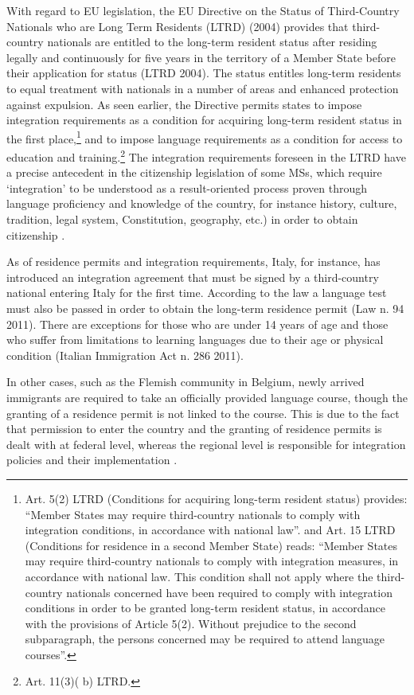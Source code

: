 \documentclass[output=paper,colorlinks,citecolor=brown]{langscibook}
\begin{document}
With regard to EU legislation, the EU Directive on the Status of Third-Country Nationals who are Long Term Residents (LTRD) (2004) provides that third-country nationals are entitled to the long-term resident status after residing legally and continuously for five years in the territory of a Member State before their application for status (LTRD 2004). The status entitles long-term residents to equal treatment with nationals in a number of areas and enhanced protection against expulsion. As seen earlier, the Directive permits states to impose integration requirements as a condition for acquiring long-term resident status in the first place,\footnote{Art. 5(2) LTRD (Conditions for acquiring long-term resident status) provides: ``Member States may require third-country nationals to comply with integration conditions, in accordance with national law''. and Art. 15 LTRD (Conditions for residence in a second Member State) reads: ``Member States may require third-country nationals to comply with integration measures, in accordance with national law. This condition shall not apply where the third-country nationals concerned have been required to comply with integration conditions in order to be granted long-term resident status, in accordance with the provisions of Article 5(2). Without prejudice to the second subparagraph, the persons concerned may be required to attend language courses''.} and to impose language requirements as a condition for access to education and training.\footnote{Art. 11(3)( b) LTRD. } The integration requirements foreseen in the LTRD have a precise antecedent in the citizenship legislation of some MSs, which require `integration' to be understood as a result-oriented process proven through language proficiency and knowledge of the country, for instance history, culture, tradition, legal system, Constitution, geography, etc.) in order to obtain citizenship \citep{baubock_et_al2006,acosta_arcarazo2011}.


As of residence permits and integration requirements, Italy, for instance, has introduced an integration agreement that must be signed by a third-country national entering Italy for the first time. According to the law a language test must also be passed in order to obtain the long-term residence permit (Law n. 94 2011). There are exceptions for those who are under 14 years of age and those who suffer from limitations to learning languages due to their age or physical condition (Italian Immigration Act n. 286 2011).

In other cases, such as the Flemish community in Belgium, newly arrived immigrants are required to take an officially provided language course, though the granting of a residence permit is not linked to the course. This is due to the fact that permission to enter the country and the granting of residence permits is dealt with at federal level, whereas the regional level is responsible for integration policies and their implementation \citep{coe2014}.
\end{document}
